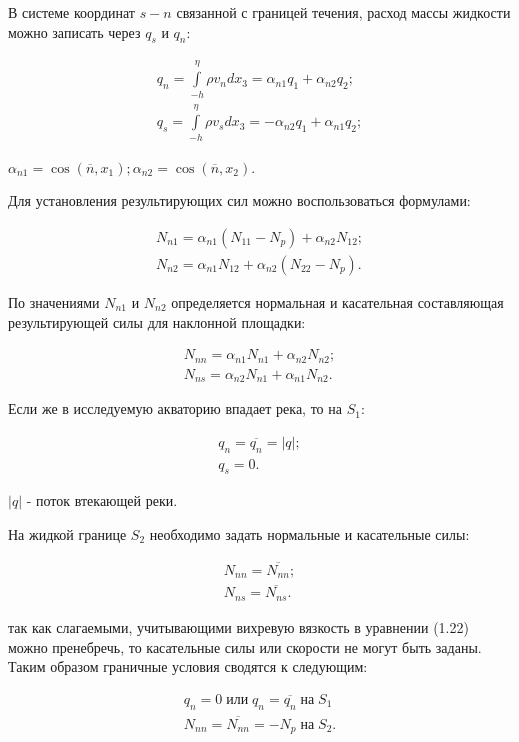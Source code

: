 \documentclass[14pt]{extreport}
\begin{document}
В системе координат $s-n$ связанной с границей течения, расход массы жидкости можно записать через $q_s$ и $q_n$:

\begin{eqnarray}
q_n=\int\limits^\eta_{-h} \rho v_n dx_3= \alpha_{n1}q_1+\alpha_{n2}q_2; \nonumber\\
q_s=\int\limits^\eta_{-h} \rho v_s dx_3= -\alpha_{n2}q_1+\alpha_{n1}q_2;
\end{eqnarray}

 $\alpha_{n1}=\cos(\overline{n},x_1); \alpha_{n2}=\cos(\overline{n},x_2).$

Для установления результирующих сил можно воспользоваться формулами:

\begin{eqnarray}
N_{n1}=\alpha_{n1}(N_{11}-N_{p})+\alpha_{n2}N_{12}; \nonumber\\
N_{n2}=\alpha_{n1}N_{12}+\alpha_{n2}(N_{22}-N_{p}).
\end{eqnarray}

По значениями $N_{n1}$ и $N_{n2}$ определяется нормальная и касательная составляющая результирующей силы для наклонной площадки:

\begin{eqnarray}
N_{nn}=\alpha_{n1}N_{n1}+\alpha_{n2}N_{n2}; \nonumber\\
N_{ns}=\alpha_{n2}N_{n1}+\alpha_{n1}N_{n2}.
\end{eqnarray}

Если же в исследуемую акваторию впадает река, то на $ S_1 $:

\begin{eqnarray}
q_n=\overline{q_n}=|q|; \nonumber\\
q_s=0.
\end{eqnarray}

 $|q|$ - поток втекающей
реки. 

На жидкой границе $ S_2 $ необходимо задать нормальные и касательные силы:

\begin{eqnarray}
N_{nn}=\overline{N_{nn}}; \nonumber\\
N_{ns}=\overline{N_{ns}}.
\end{eqnarray}

 так как слагаемыми, учитывающими вихревую вязкость в уравнении (1.22) можно пренебречь, то касательные силы или скорости не могут быть заданы. Таким образом граничные условия сводятся к следующим:

\begin{eqnarray}
q_n=0 \; \text{или} \; q_n=\overline{q_n} \; \text{на} \; S_1\nonumber\\
N_{nn}=\overline{N_{nn}}=-N_p \; \text{на} \; S_2.
\end{eqnarray}
\end{document}
